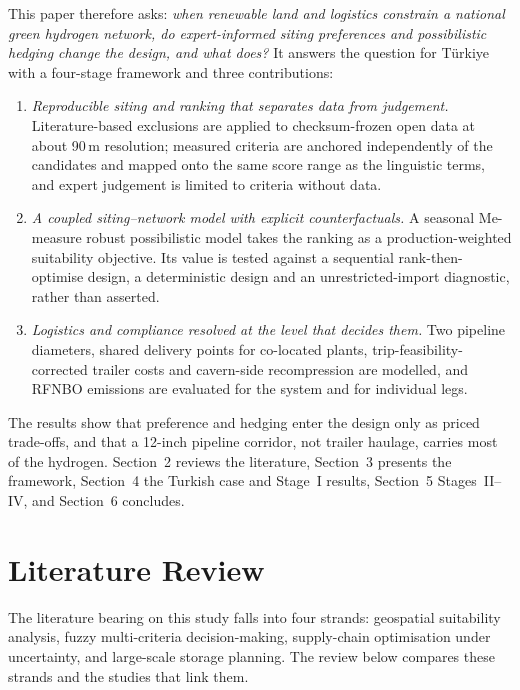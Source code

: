 \documentclass[preprint,12pt,authoryear]{elsarticle}
\begin{document}
This paper therefore asks: \textit{when renewable land and logistics constrain a national green hydrogen network, do expert-informed siting preferences and possibilistic hedging change the design, and what does?} It answers the question for Türkiye with a four-stage framework and three contributions:
\begin{enumerate}
    \item \textit{Reproducible siting and ranking that separates data from judgement.} Literature-based exclusions are applied to checksum-frozen open data at about 90\,m resolution; measured criteria are anchored independently of the candidates and mapped onto the same score range as the linguistic terms, and expert judgement is limited to criteria without data.
    \item \textit{A coupled siting--network model with explicit counterfactuals.} A seasonal Me-measure robust possibilistic model takes the ranking as a production-weighted suitability objective. Its value is tested against a sequential rank-then-optimise design, a deterministic design and an unrestricted-import diagnostic, rather than asserted.
    \item \textit{Logistics and compliance resolved at the level that decides them.} Two pipeline diameters, shared delivery points for co-located plants, trip-feasibility-corrected trailer costs and cavern-side recompression are modelled, and RFNBO emissions are evaluated for the system and for individual legs.
\end{enumerate}
The results show that preference and hedging enter the design only as priced trade-offs, and that a 12-inch pipeline corridor, not trailer haulage, carries most of the hydrogen. Section~2 reviews the literature, Section~3 presents the framework, Section~4 the Turkish case and Stage~I results, Section~5 Stages~II--IV, and Section~6 concludes.

\section{Literature Review}
The literature bearing on this study falls into four strands: geospatial suitability analysis, fuzzy multi-criteria decision-making, supply-chain optimisation under uncertainty, and large-scale storage planning. The review below compares these strands and the studies that link them.
\end{document}
